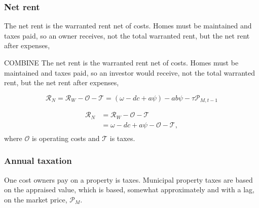 
\subsubsection{Net rent} \label{section-net-rent}
The \gls{net rent} is the warranted rent net of costs. Homes must be maintained and taxes paid, so an owner receives, not the total warranted rent, but the net rent after expenses,


COMBINE The \gls{net rent} is the warranted rent net of costs. Homes must be maintained and taxes paid, so an investor would receive, not the total warranted rent, but the net rent after expenses,

\[\mathcal{R}_N = \mathcal{R}_W - \mathcal{O} - \mathcal{T}= (\omega - {dc} + a\psi )- a b \psi - \tau  \mathcal{P}_{M, t-1}\]






\begin{align}
\mathcal{R}_N &= \mathcal{R}_W - \mathcal{O} - \mathcal{T}\\
&= \omega - {dc} + a\psi -  \mathcal{O} - \mathcal{T}, \\
\end{align}
where $\mathcal{O}$ is operating costs and $\mathcal{T}$ is taxes. 






\subsubsection{Annual taxation}

One cost owners pay on a property is taxes. Municipal property taxes are based on the \gls{appraised value}, which is based, somewhat approximately and with a lag, on the \gls{market price}, $\mathcal{P}_M$. %

